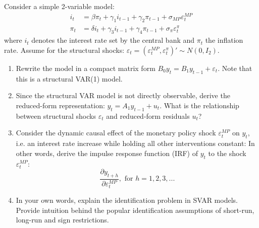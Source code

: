 Consider a simple 2-variable model:
\begin{align*}
    i_t   & =  \beta \pi_t + \gamma_1 i_{t-1} + \gamma_2 \pi_{t-1} + \sigma_{MP} \varepsilon_t^{MP}  \\
    \pi_t & =  \delta i_t + \gamma_3 i_{t-1} + \gamma_4 \pi_{t-1} + \sigma_{\pi} \varepsilon_t^{\pi}
\end{align*}
where $i_t$ denotes the interest rate set by the central bank and $\pi_t$ the inflation rate. Assume
for the structural shocks: $\varepsilon_{t}=(\varepsilon_t^{MP}, \varepsilon_t^{\pi})' \sim N(0,I_2)$.
\begin{enumerate}
    \item Rewrite the model in a compact matrix form $B_0 y_t = B_1 y_{t-1} + \varepsilon_{t}$. Note that this is a structural VAR(1) model.
    \item Since the structural VAR model is not directly observable, derive the reduced-form representation: $y_t=A_1 y_{t-1} + u_t$. What is the relationship between structural shocks $\varepsilon_t$ and reduced-form residuals $u_t$?
    \item Consider the dynamic causal effect of the monetary policy shock $\varepsilon_t^{MP}$ on $y_t$, i.e. an interest rate increase while holding all other interventions constant: In other words, derive the impulse response function (IRF) of $y_t$ to the shock $\varepsilon_t^{MP}$: $$\frac{\partial y_{t+h}}{\partial \varepsilon_t^{MP}}, \text{ for } h=1,2,3,...$$
    \item In your own words, explain the identification problem in SVAR models. Provide intuition behind the popular identification assumptions of short-run, long-run and sign restrictions.
\end{enumerate}